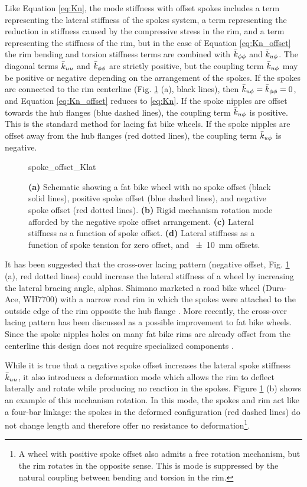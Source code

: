 \documentclass[\rootdir/thesis.tex]{subfiles}
\begin{document}
Like Equation \eqref{eq:Kn}, the mode stiffness with offset spokes includes a term representing the lateral stiffness of the spokes system, a term representing the reduction in stiffness caused by the compressive stress in the rim, and a term representing the stiffness of the rim, but in the case of Equation \eqref{eq:Kn_offset} the rim bending and torsion stiffness terms are combined with $\bar{k}_{\phi\phi}$ and $\bar{k}_{u\phi}$. The diagonal terms $\bar{k}_{uu}$ and $\bar{k}_{\phi\phi}$ are strictly positive, but the coupling term $\bar{k}_{u\phi}$ may be positive or negative depending on the arrangement of the spokes. If the spokes are connected to the rim centerline (Fig. \ref{fig:spoke_offset} (a), black lines), then $\bar{k}_{u\phi}=\bar{k}_{\phi\phi}=0$, and Equation \eqref{eq:Kn_offset} reduces to \eqref{eq:Kn}. If the spoke nipples are offset towards the hub flanges (blue dashed lines), the coupling term $\bar{k}_{u\phi}$ is positive. This is the standard method for lacing fat bike wheels. If the spoke nipples are offset away from the hub flanges (red dotted lines), the coupling term $\bar{k}_{u\phi}$ is negative.

\begin{figure}[t]
\centering
{spoke_offset_Klat}
\caption{\textbf{(a)} Schematic showing a fat bike wheel with no spoke offset (black solid lines), positive spoke offset (blue dashed lines), and negative spoke offset (red dotted lines). \textbf{(b)} Rigid mechanism rotation mode afforded by the negative spoke offset arrangement. \textbf{(c)} Lateral stiffness as a function of spoke offset. \textbf{(d)} Lateral stiffness as a function of spoke tension for zero offset, and \SI{+-10}{mm} offsets.}
\label{fig:spoke_offset}
\end{figure}

It has been suggested that the cross-over lacing pattern (negative offset, Fig. \ref{fig:spoke_offset} (a), red dotted lines) could increase the lateral stiffness of a wheel by increasing the lateral bracing angle, \gls{alphas}. Shimano marketed a road bike wheel (Dura-Ace, WH7700) with a narrow road rim in which the spokes were attached to the outside edge of the rim opposite the hub flange \cite{Rinard}. More recently, the cross-over lacing pattern has been discussed as a possible improvement to fat bike wheels. Since the spoke nipples holes on many fat bike rims are already offset from the centerline this design does not require specialized components \cite{MTB forums}.

While it is true that a negative spoke offset increases the lateral spoke stiffness $\bar{k}_{uu}$, it also introduces a deformation mode which allows the rim to deflect laterally and rotate while producing no reaction in the spokes. Figure \ref{fig:spoke_offset} (b) shows an example of this mechanism rotation. In this mode, the spokes and rim act like a four-bar linkage: the spokes in the deformed configuration (red dashed lines) do not change length and therefore offer no resistance to deformation\footnote{A wheel with positive spoke offset also admits a free rotation mechanism, but the rim rotates in the opposite sense. This is mode is suppressed by the natural coupling between bending and torsion in the rim.}.
\end{document}
